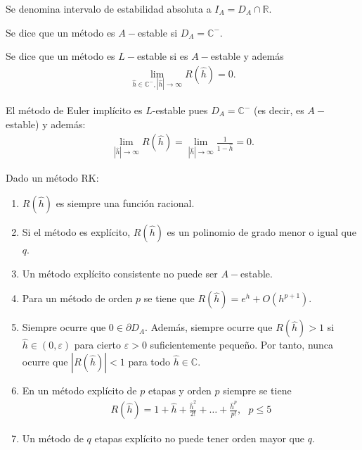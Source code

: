 \begin{defi}
Se denomina intervalo de estabilidad absoluta a $I_A = D_A \cap \mathbb{R}$.
\end{defi}

\begin{defi}
Se dice que un método es $A-$estable si $D_A = \mathbb{C}^-$.
\end{defi}

\begin{defi}
Se dice que un método es $L-$estable si es $A-$estable y además
\begin{align*}
    \lim_{\hat{h} \in\mathbb{C}^-, |\hat{h}| \to \infty} R(\hat{h}) = 0.
\end{align*}
\end{defi}

\begin{ejemplo}
El método de Euler implícito es $L$-estable pues $D_A = \mathbb{C}^-$ (es decir, es $A-$estable) y además:
\begin{align*}
    \lim_{|\hat{h}| \to \infty} R(\hat{h}) = \lim_{|\hat{h}| \to \infty} \frac{1}{1- \hat{h}} = 0.
\end{align*}
\end{ejemplo}

\begin{obs}
Dado un método RK:
\begin{enumerate}
    \item $R(\hat{h})$ es siempre una función racional.
    \item Si el método es explícito, $R(\hat{h})$ es un polinomio de grado menor o igual que $q$.
    \item Un método explícito consistente no puede ser $A-$estable.
    \item Para un método de orden $p$ se tiene que $R(\hat{h}) = e^h + O(h^{p+1})$.
    \item Siempre ocurre que $0 \in \partial D_A$. Además, siempre ocurre que $R(\hat{h}) > 1$ si $\hat{h} \in (0,\varepsilon)$ para cierto $\varepsilon > 0$ suficientemente pequeño. Por tanto, nunca ocurre que $|R(\hat{h})| < 1$ para todo $\hat{h} \in \mathbb{C}$.
    \item En un método explícito de $p$ etapas y orden $p$ siempre se tiene
    \begin{align*}
        R(\hat{h}) = 1 + \hat{h} + \frac{\hat{h}^2}{2!} + \ldots + \frac{\hat{h}^p}{p!}, \ \ \ p \leq 5
    \end{align*}
    \item Un método de $q$ etapas explícito no puede tener orden mayor que $q$.
\end{enumerate}
\end{obs}

